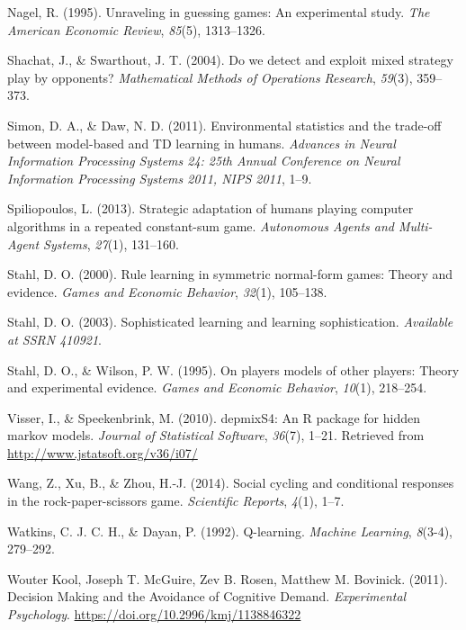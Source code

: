 \documentclass[english,man,floatsintext]{apa6}
\begin{document}
\leavevmode\hypertarget{ref-nagel1995unraveling}{}%
Nagel, R. (1995). Unraveling in guessing games: An experimental study. \emph{The American Economic Review}, \emph{85}(5), 1313--1326.

\leavevmode\hypertarget{ref-shachat2004we}{}%
Shachat, J., \& Swarthout, J. T. (2004). Do we detect and exploit mixed strategy play by opponents? \emph{Mathematical Methods of Operations Research}, \emph{59}(3), 359--373.

\leavevmode\hypertarget{ref-Simon_Daw_11}{}%
Simon, D. A., \& Daw, N. D. (2011). Environmental statistics and the trade-off between model-based and TD learning in humans. \emph{Advances in Neural Information Processing Systems 24: 25th Annual Conference on Neural Information Processing Systems 2011, NIPS 2011}, 1--9.

\leavevmode\hypertarget{ref-spiliopoulos2013strategic}{}%
Spiliopoulos, L. (2013). Strategic adaptation of humans playing computer algorithms in a repeated constant-sum game. \emph{Autonomous Agents and Multi-Agent Systems}, \emph{27}(1), 131--160.

\leavevmode\hypertarget{ref-stahl2000rule}{}%
Stahl, D. O. (2000). Rule learning in symmetric normal-form games: Theory and evidence. \emph{Games and Economic Behavior}, \emph{32}(1), 105--138.

\leavevmode\hypertarget{ref-stahl2003sophisticated}{}%
Stahl, D. O. (2003). Sophisticated learning and learning sophistication. \emph{Available at SSRN 410921}.

\leavevmode\hypertarget{ref-stahl1995players}{}%
Stahl, D. O., \& Wilson, P. W. (1995). On players models of other players: Theory and experimental evidence. \emph{Games and Economic Behavior}, \emph{10}(1), 218--254.

\leavevmode\hypertarget{ref-R-depmixS4}{}%
Visser, I., \& Speekenbrink, M. (2010). depmixS4: An R package for hidden markov models. \emph{Journal of Statistical Software}, \emph{36}(7), 1--21. Retrieved from \url{http://www.jstatsoft.org/v36/i07/}

\leavevmode\hypertarget{ref-wang2014social}{}%
Wang, Z., Xu, B., \& Zhou, H.-J. (2014). Social cycling and conditional responses in the rock-paper-scissors game. \emph{Scientific Reports}, \emph{4}(1), 1--7.

\leavevmode\hypertarget{ref-watkins1992q}{}%
Watkins, C. J. C. H., \& Dayan, P. (1992). Q-learning. \emph{Machine Learning}, \emph{8}(3-4), 279--292.

\leavevmode\hypertarget{ref-Kool_2011}{}%
Wouter Kool, Joseph T. McGuire, Zev B. Rosen, Matthew M. Bovinick. (2011). Decision Making and the Avoidance of Cognitive Demand. \emph{Experimental Psychology}. \url{https://doi.org/10.2996/kmj/1138846322}
\end{document}
